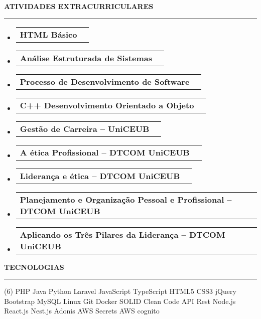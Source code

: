 \documentclass[a4paper,10pt]{article}
\makeatletter
\newcommand{\ProjectItem}[2]{
    \item
        \begin{tabular*}{0.93\textwidth}[t]{l@{\extracolsep{\fill}}r}
            \textbf{#1} & \footnotesize#2
        \end{tabular*}
}
\newcommand{\SectionTitle}[1]{
    \begin{flushleft}
    \textbf{#1}
    \noindent\textcolor{gray}{\rule{18.5cm}{1px}}
    \end{flushleft}
}
\newcommand{\SectionBegin}[0]{
    \vspace{-16pt}\begin{flushleft}
    \begin{itemize}
}
\newcommand{\SectionEnd}[0]{
    \end{itemize}
    \end{flushleft}\vspace{-2pt}
}
\makeatother
\begin{document}
\SectionTitle
{ATIVIDADES EXTRACURRICULARES}
\SectionBegin
\ProjectItem{HTML Básico}{}
\ProjectItem{Análise Estruturada de Sistemas}{}
\ProjectItem{Processo de Desenvolvimento de Software}{}
\ProjectItem{C++ Desenvolvimento Orientado a Objeto}{}
\ProjectItem{Gestão de Carreira – UniCEUB}{}
\ProjectItem{A ética Profissional – DTCOM UniCEUB}{}
\ProjectItem{Liderança e ética – DTCOM UniCEUB}{}
\ProjectItem{Planejamento e Organização Pessoal e Profissional – DTCOM UniCEUB}{}
\ProjectItem{Aplicando os Três Pilares da Liderança – DTCOM UniCEUB}{}
\SectionEnd

\SectionTitle
{TECNOLOGIAS}
\begin{tasks}[style=itemize, column-sep=-13mm, label-align=left, label-offset={0mm}](6)%
    \task PHP
    \task Java
    \task Python
    \task Laravel
    \task JavaScript
    \task TypeScript
    \task HTML5
    \task CSS3
    \task jQuery
    \task Bootstrap
    \task MySQL
    \task Linux
    \task Git
    \task Docker
    \task SOLID
    \task Clean Code
    \task API Rest
    \task Node.js
    \task React.js
    \task Nest.js
    \task Adonis
    \task AWS Secrets
    \task AWS cognito
\end{tasks}
\end{document}
